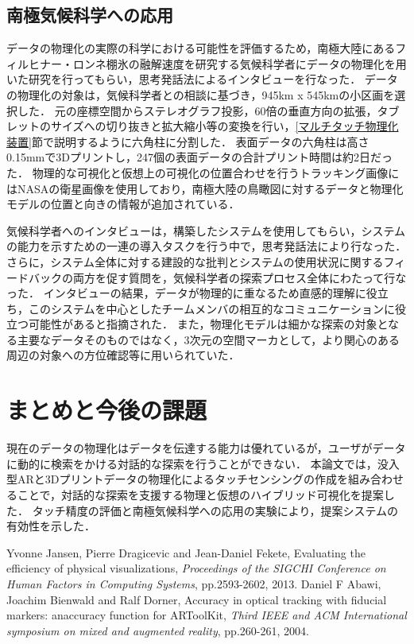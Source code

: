 \documentclass[a4paper,10pt,twocolumn,uplatex]{jsarticle}
\begin{document}
\subsection{南極気候科学への応用}
データの物理化の実際の科学における可能性を評価するため，南極大陸にあるフィルヒナー・ロンネ棚氷の融解速度を研究する気候科学者にデータの物理化を用いた研究を行ってもらい，思考発話法によるインタビューを行なった．
データの物理化の対象は，気候科学者との相談に基づき，945km x 545kmの小区画を選択した．
元の座標空間からステレオグラフ投影，60倍の垂直方向の拡張，タブレットのサイズへの切り抜きと拡大縮小等の変換を行い，\ref{マルチタッチ物理化装置}節で説明するように六角柱に分割した．
表面データの六角柱は高さ0.15mmで3Dプリントし，247個の表面データの合計プリント時間は約2日だった．
物理的な可視化と仮想上の可視化の位置合わせを行うトラッキング画像にはNASAの衛星画像を使用しており，南極大陸の鳥瞰図に対するデータと物理化モデルの位置と向きの情報が追加されている．\par
気候科学者へのインタビューは，構築したシステムを使用してもらい，システムの能力を示すための一連の導入タスクを行う中で，思考発話法により行なった．
さらに，システム全体に対する建設的な批判とシステムの使用状況に関するフィードバックの両方を促す質問を，気候科学者の探索プロセス全体にわたって行なった．
インタビューの結果，データが物理的に重なるため直感的理解に役立ち，このシステムを中心としたチームメンバの相互的なコミュニケーションに役立つ可能性があると指摘された．
また，物理化モデルは細かな探索の対象となる主要なデータそのものではなく，3次元の空間マーカとして，より関心のある周辺の対象への方位確認等に用いられていた．

\section{まとめと今後の課題}
現在のデータの物理化はデータを伝達する能力は優れているが，ユーザがデータに動的に検索をかける対話的な探索を行うことができない．
本論文では，没入型ARと3Dプリントデータの物理化によるタッチセンシングの作成を組み合わせることで，対話的な探索を支援する物理と仮想のハイブリッド可視化を提案した．
タッチ精度の評価と南極気候科学への応用の実験により，提案システムの有効性を示した．

\footnotesize{
  \begin{thebibliography}{99}
     Yvonne Jansen, Pierre Dragicevic and Jean-Daniel Fekete, Evaluating the efficiency of physical visualizations, \textit{Proceedings of the SIGCHI Conference on Human Factors in Computing Systems}, pp.2593-2602, 2013.
     Daniel F Abawi, Joachim Bienwald and Ralf Dorner, Accuracy in optical tracking with fiducial markers: anaccuracy function for ARToolKit, \textit{Third IEEE and ACM International symposium on mixed and augmented reality}, pp.260-261, 2004.
  \end{thebibliography}
}

% 
% 

\end{document}
